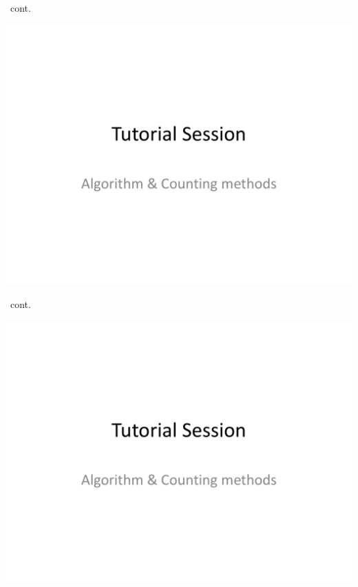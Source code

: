 \documentclass[handout]{beamer}
\begin{document}
    \begin{frame}[c,shrink]{\secname\ cont.}
        \centerline{\includegraphics[height=0.85\textheight,page=4]{algo_counting}}
    \end{frame}
    \begin{frame}[c,shrink]{\secname\ cont.}
        \centerline{\includegraphics[height=0.85\textheight,page=5]{algo_counting}}
    \end{frame}
\end{document}
